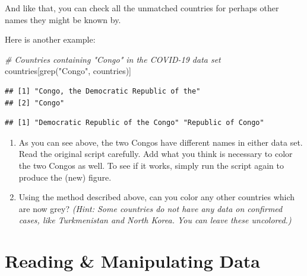 \documentclass[
]{book}
\newenvironment{Shaded}{\begin{snugshade}}{\end{snugshade}}
\newcommand{\CommentTok}[1]{\textcolor[rgb]{0.56,0.35,0.01}{\textit{#1}}}
\newcommand{\FunctionTok}[1]{\textcolor[rgb]{0.00,0.00,0.00}{#1}}
\newcommand{\NormalTok}[1]{#1}
\newcommand{\SpecialCharTok}[1]{\textcolor[rgb]{0.00,0.00,0.00}{#1}}
\newcommand{\StringTok}[1]{\textcolor[rgb]{0.31,0.60,0.02}{#1}}
\providecommand{\tightlist}{%
  \setlength{\itemsep}{0pt}\setlength{\parskip}{0pt}}
\begin{document}
And like that, you can check all the unmatched countries for perhaps other names they might be known by.

Here is another example:

\begin{Shaded}
\begin{Highlighting}[]
\CommentTok{\# Countries containing "Congo" in the COVID{-}19 data set}
\NormalTok{countries[}\FunctionTok{grep}\NormalTok{(}\StringTok{"Congo"}\NormalTok{, countries)]}
\end{Highlighting}
\end{Shaded}

\begin{verbatim}
## [1] "Congo, the Democratic Republic of the"
## [2] "Congo"
\end{verbatim}

\begin{Shaded}
\end{Shaded}

\begin{verbatim}
## [1] "Democratic Republic of the Congo" "Republic of Congo"
\end{verbatim}

\begin{enumerate}
\def\labelenumi{\arabic{enumi}.}
\tightlist
\item
  As you can see above, the two Congos have different names in either data set. Read the original script carefully. Add what you think is necessary to color the two Congos as well. To see if it works, simply run the script again to produce the (new) figure.
\item
  Using the method described above, can you color any other countries which are now grey? \emph{(Hint: Some countries do not have any data on confirmed cases, like Turkmenistan and North Korea. You can leave these uncolored.)}
\end{enumerate}

\hypertarget{data-manipulation}{%
\chapter{Reading \& Manipulating Data}\label{data-manipulation}}
\end{document}

